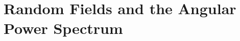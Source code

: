 \chapter{Random Fields and the Angular Power Spectrum}\label{ch:07}

\providecommand{\SevAEnsXiTwo}{}\renewcommand{\SevAEnsXiTwo}{0.8555}
\providecommand{\SevAEnsXiBTwo}{}\renewcommand{\SevAEnsXiBTwo}{0.8934}
\providecommand{\SevATheoXiTwo}{}\renewcommand{\SevATheoXiTwo}{0.8825}
\providecommand{\SevAEnsXiSix}{}\renewcommand{\SevAEnsXiSix}{0.3074}
\providecommand{\SevAEnsXiBSix}{}\renewcommand{\SevAEnsXiBSix}{0.3203}
\providecommand{\SevATheoXiSix}{}\renewcommand{\SevATheoXiSix}{0.3247}
\providecommand{\SevAEnsXiFifteen}{}\renewcommand{\SevAEnsXiFifteen}{-0.01811}
\providecommand{\SevAEnsXiBFifteen}{}\renewcommand{\SevAEnsXiBFifteen}{-0.006406}
\providecommand{\SevATheoXiFifteen}{}\renewcommand{\SevATheoXiFifteen}{8.838\times10^{-4}}
\providecommand{\SevAEnsVar}{}\renewcommand{\SevAEnsVar}{0.977}
\providecommand{\SevAEnsM}{}\renewcommand{\SevAEnsM}{3000}
\providecommand{\SevAEnsSE}{}\renewcommand{\SevAEnsSE}{0.01826}
\providecommand{\SevACondNubar}{}\renewcommand{\SevACondNubar}{2.379}
\providecommand{\SevACondProfFour}{}\renewcommand{\SevACondProfFour}{1.478}
\providecommand{\SevACondTheoFour}{}\renewcommand{\SevACondTheoFour}{1.443}
\providecommand{\SevAHotFrac}{}\renewcommand{\SevAHotFrac}{0.02405}
\providecommand{\SevAWickGaussZero}{}\renewcommand{\SevAWickGaussZero}{0.9949}
\providecommand{\SevAWickGaussSix}{}\renewcommand{\SevAWickGaussSix}{1.009}
\providecommand{\SevAWickLogZero}{}\renewcommand{\SevAWickLogZero}{9.061}
\providecommand{\SevAWickLogSix}{}\renewcommand{\SevAWickLogSix}{2.823}
\providecommand{\SevAOffDiagExact}{}\renewcommand{\SevAOffDiagExact}{2.402\times10^{-14}}
\providecommand{\SevADiagMatch}{}\renewcommand{\SevADiagMatch}{6.217\times10^{-15}}
\providecommand{\SevAEigMatch}{}\renewcommand{\SevAEigMatch}{5.329\times10^{-15}}
\providecommand{\SevAMinLam}{}\renewcommand{\SevAMinLam}{-4.441\times10^{-16}}
\providecommand{\SevANBig}{}\renewcommand{\SevANBig}{25}
\providecommand{\SevAOffDiagRMS}{}\renewcommand{\SevAOffDiagRMS}{0.00727}
\providecommand{\SevANoiseExpect}{}\renewcommand{\SevANoiseExpect}{0.007071}
\providecommand{\SevAM}{}\renewcommand{\SevAM}{20000}
\providecommand{\SevAHankelErrA}{}\renewcommand{\SevAHankelErrA}{8.335\times10^{-8}}
\providecommand{\SevAHankelErrB}{}\renewcommand{\SevAHankelErrB}{0.02499}
\providecommand{\SevABandXiMin}{}\renewcommand{\SevABandXiMin}{-0.3749}
\providecommand{\SevABandRMin}{}\renewcommand{\SevABandRMin}{7.519}
